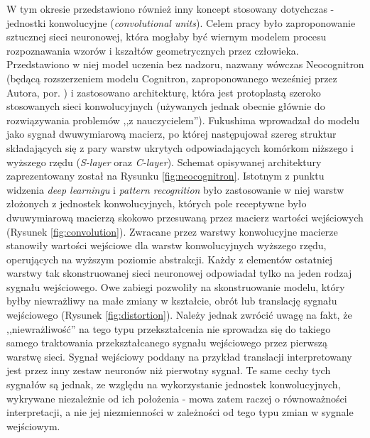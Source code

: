 \documentclass[12pt,a4paper,twoside]{article}
\begin{document}
W tym okresie przedstawiono również inny koncept stosowany dotychczas - jednostki konwolucyjne (\textit{convolutional units}). Celem pracy \citet{fukushima1980} było zaproponowanie sztucznej sieci neuronowej, która mogłaby być wiernym modelem procesu rozpoznawania wzorów i kszałtów geometrycznych przez człowieka. Przedstawiono w niej model uczenia bez nadzoru, nazwany wówczas Neocognitron (będącą rozszerzeniem modelu Cognitron, zaproponowanego wcześniej przez Autora, por. \citet{fukushima1975}) i zastosowano architekturę, która jest protoplastą szeroko stosowanych sieci konwolucyjnych (używanych jednak obecnie głównie do rozwiązywania problemów ,,z nauczycielem''). Fukushima wprowadzał do modelu jako sygnał dwuwymiarową macierz, po której następujował szereg struktur składających się z pary warstw ukrytych odpowiadających komórkom niższego i wyższego rzędu (\textit{S-layer} oraz \textit{C-layer}). Schemat opisywanej architektury zaprezentowany został na Rysunku \ref{fig:neocognitron}. Istotnym z punktu widzenia \textit{deep learningu} i \textit{pattern recognition} było zastosowanie w niej warstw złożonych z jednostek konwolucyjnych, których pole receptywne było dwuwymiarową macierzą skokowo przesuwaną przez macierz wartości wejściowych (Rysunek \ref{fig:convolution}). Zwracane przez warstwy konwolucyjne macierze stanowiły wartości wejściowe dla warstw konwolucyjnych wyższego rzędu, operujących na wyższym poziomie abstrakcji. Każdy z elementów ostatniej warstwy tak skonstruowanej sieci neuronowej odpowiadał tylko na jeden rodzaj sygnału wejściowego. Owe zabiegi pozwoliły na skonstruowanie modelu, który byłby niewrażliwy na małe zmiany w kształcie, obrót lub translację sygnału wejściowego (Rysunek \ref{fig:distortion}). Należy jednak zwrócić uwagę na fakt, że ,,niewrażliwość'' na tego typu przekształcenia nie sprowadza się do takiego samego traktowania przekształcanego sygnału wejściowego przez pierwszą warstwę sieci. Sygnał wejściowy poddany na przykład translacji interpretowany jest przez inny zestaw neuronów niż pierwotny sygnał. Te same cechy tych sygnałów są jednak, ze względu na wykorzystanie jednostek konwolucyjnych, wykrywane niezależnie od ich położenia - mowa zatem raczej o równoważności interpretacji, a nie jej niezmienności w zależności od tego typu zmian w sygnale wejściowym.
\end{document}
